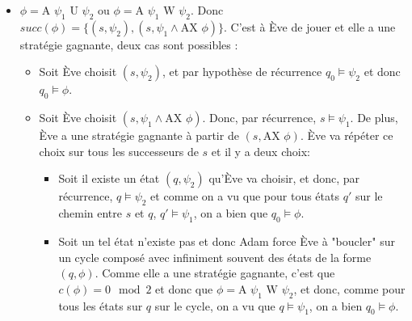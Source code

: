 \documentclass[10pt,a4paper]{article}
\begin{document}
\begin{itemize}
\item $\phi = \mbox{A } \psi_1 \mbox{ U } \psi_2$ ou $\phi = \mbox{A } \psi_1 \mbox{ W } \psi_2$. Donc $succ(\phi) = \{ (s,\psi_2), (s, \psi_1 \land \mbox{AX } \phi) \}$. C'est à Ève de jouer et elle a une stratégie gagnante, deux cas sont possibles :
\begin{itemize}
	\item Soit Ève choisit $(s,\psi_2)$, et par hypothèse de récurrence $q_0 \vDash \psi_2$ et donc $q_0 \vDash \phi$.
	\item Soit Ève choisit $(s, \psi_1 \land \mbox{AX } \phi)$. Donc, par récurrence, $s \vDash \psi_1$. De plus, Ève a une stratégie gagnante à partir de $(s,\mbox{AX } \phi)$.
	Ève va répéter ce choix sur tous les successeurs de $s$ et il y a deux choix:
	\begin{itemize}
		\item Soit il existe un état $(q,\psi_2)$ qu'Ève va choisir, et donc, par récurrence, $q \vDash \psi_2$ et comme on a vu que pour tous états $q'$ sur le chemin entre $s$ et $q$, $q' \vDash \psi_1$, on a bien que $q_0 \vDash \phi$.
		\item Soit un tel état n'existe pas et donc Adam force Ève à "boucler" sur un cycle composé avec infiniment souvent des états de la forme $(q,\phi)$. Comme elle a une stratégie gagnante, c'est que $c(\phi) = 0 \mod 2$ et donc que $\phi = \mbox{A } \psi_1 \mbox{ W } \psi_2 $, et donc, comme pour tous les états sur $q$ sur le cycle, on a vu que $q \vDash \psi_1$, on a bien $q_0 \vDash \phi$.
	\end{itemize}
\end{itemize}
\end{itemize}
\end{document}
